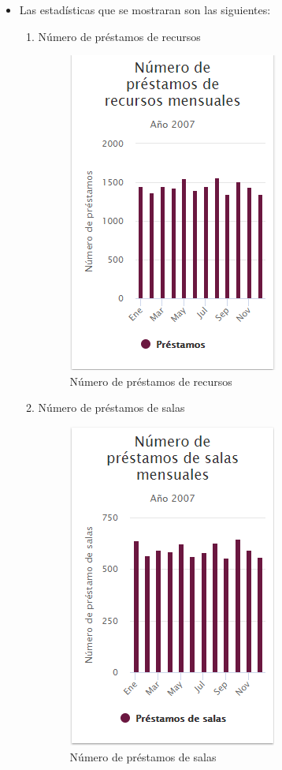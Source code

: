 \begin{itemize}
	\item  Las estadísticas que se mostraran son las siguientes:
	\begin{enumerate}
		
		\item Número de préstamos de recursos
		\begin{figure}[hbtp]
	\includegraphics[scale=0.5]{images/InterfazMovil/IUGS15_recursosMes.PNG}
	\caption{Número de préstamos de recursos}
	\end{figure}
	
	\item Número de préstamos de salas
	\begin{figure}[hbtp]
	\includegraphics[scale=0.5]{images/InterfazMovil/IUGS15_salasMes.PNG}
	\caption{Número de préstamos de salas}
	\end{figure}
	

\end{enumerate}
\end{itemize}
